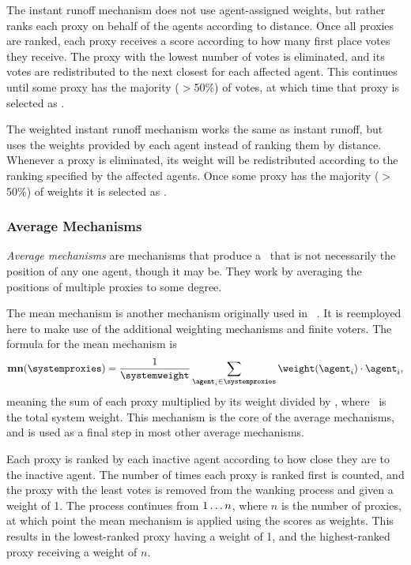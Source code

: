 \label{para:cand-instant-runoff}
The instant runoff mechanism does not use agent-assigned weights, but rather
ranks each proxy on behalf of the agents according to distance.
Once all proxies are ranked, each proxy receives a score according to how
many first place votes they receive.
The proxy with the lowest number of votes is eliminated, and its votes are
redistributed to the next closest for each affected agent.
This continues until some proxy has the majority ($>$50\%) of votes, at which
time that proxy is selected as \systemtruth.

\label{para:cand-weighted-instant-runoff}
\label{para:candidate-weighted-instant-runoff}
The weighted instant runoff mechanism works the same as instant runoff, but uses
the weights provided by each agent instead of ranking them by distance.
Whenever a proxy is eliminated, its weight will be redistributed according to
the ranking specified by the affected agents.
Once some proxy has the majority ($>$50\%) of weights it is selected as
\systemtruth.

\subsubsection{Average Mechanisms}\label{subsubsec:average-mechanisms}
\textit{Average mechanisms} are mechanisms that produce a \systemtruth\ that
is not necessarily the position of any one agent, though it may be.
They work by averaging the positions of multiple proxies to some degree.

\label{para:mean}
The mean mechanism is another mechanism originally used in
~\cite{Cohensius2017}.
It is reemployed here to make use of the additional weighting mechanisms and
finite voters.
The formula for the mean mechanism is
\begin{equation*}
    \mathbf{mn}(\systemproxies) =
    \frac{1}{\systemweight}
    \sum_{\agent_i \in \systemproxies} {\weightof{\agent_i} \cdot \agent_i}
    \text{,}\label{eq:mean-mechanism}
\end{equation*}
meaning the sum of each proxy multiplied by its weight divided by
\systemweight, where \systemweight\ is the total system weight.
This mechanism is the core of the average mechanisms, and is used as a final
step in most other average mechanisms.

\label{para:avg-ranked-choice}
Each proxy is ranked by each inactive agent according to how close they are
to the inactive agent.
The number of times each proxy is ranked first is counted, and the proxy with
the least votes is removed from the wanking process and given a weight of 1.
The process continues from $1 \mathellipsis n$, where $n$ is the number of
proxies, at which point the mean mechanism is applied using the scores as
weights.
This results in the lowest-ranked proxy having a weight of 1, and the
highest-ranked proxy receiving a weight of $n$.

